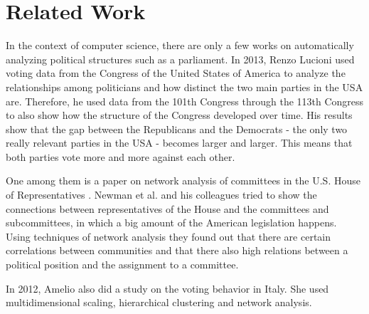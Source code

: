 \chapter{Related Work}
\label{chap:relatedwork}

In the context of computer science, there are only a few works on automatically analyzing political structures such as a parliament. In 2013, Renzo Lucioni \cite{Lucioni_2015} used voting data from the Congress of the United States of America to analyze the relationships among politicians and how distinct the two main parties in the USA are. Therefore, he used data from the 101th Congress through the 113th Congress to also show how the structure of the Congress developed over time. His results show that the gap between the Republicans and the Democrats - the only two really relevant parties in the USA - becomes larger and larger. This means that both parties vote more and more against each other.

One among them is a paper on network analysis of committees in the U.S. House of Representatives \cite{Porter_2005}. Newman et al. and his colleagues tried to show the connections between representatives of the House and the committees and subcommittees, in which a big amount of the American legislation happens. Using techniques of network analysis they found out that there are certain correlations between communities and that there also high relations between a political position and the assignment to a committee. 

In 2012, Amelio \cite{Amelio_2012} also did a study on the voting behavior in Italy. She used multidimensional scaling, hierarchical clustering and network analysis.






